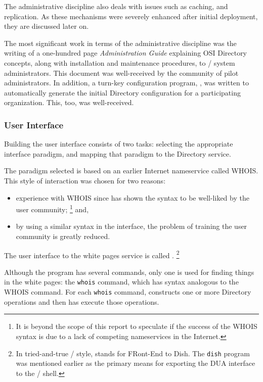 The administrative discipline also deals with issues such as caching, and
replication.
As these mechanisms were severely enhanced after initial deployment,
they are discussed later on.

The most significant work in terms of the administrative discipline was the
writing of a one-hundred page {\em Administration Guide} explaining OSI
Directory concepts,
along with installation and maintenance procedures,
to \unix/ system administrators.
This document was well-received by the community of pilot administrators.
In addition,
a turn-key configuration program,
,
was written to automatically generate the initial Directory configuration for
a participating organization.
This, too, was well-received.

\subsubsection	{User Interface}
Building the user interface consists of two tasks:
selecting the appropriate interface paradigm,
and mapping that paradigm to the Directory service.

The paradigm selected is based on an earlier Internet nameservice called WHOIS.
This style of interaction was chosen for two reasons:
\begin{itemize}
\item	experience with WHOIS since {\/} has shown the syntax to
be well-liked by the user community;%
\footnote{It is beyond the scope of this report to speculate if the success of
the WHOIS syntax is due to a lack of competing nameservices in the Internet.}
and,

\item	by using a similar syntax in the interface,
the problem of training the user community is greatly reduced.
\end{itemize}
The user interface to the white pages service is called .%
\footnote{In tried-and-true \unix/ style,
 stands for FRont-End to Dish.
The \verb"dish" program was mentioned earlier as the primary means for
exporting the DUA interface to the \unix/ shell.}

Although the program has several commands,
only one is used for finding things in the white pages:
the \verb"whois" command,
which has syntax analogous to the WHOIS command.
For each \verb"whois" command,
 constructs one or more Directory operations and then has 
execute those operations.

